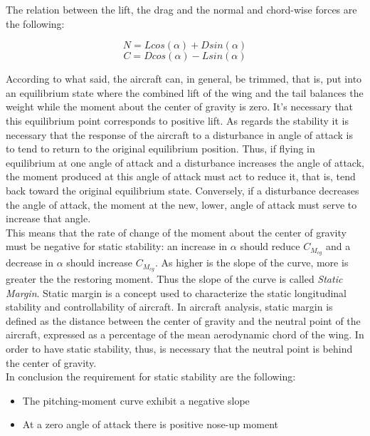 The relation between the lift, the drag and the normal and chord-wise forces are the following:

\begin{equation}
N =L cos({\alpha}) + D sin({\alpha})
\end{equation}
\begin{equation}
C = D cos({\alpha}) - L sin({\alpha})
\end{equation}

According to what said, the aircraft can, in general, be trimmed, that is, put into an equilibrium state where the combined lift of the wing and the tail balances the weight while the moment about the center of gravity is zero. It's necessary that this equilibrium point corresponds to positive lift. As regards the stability it is necessary that the response of the aircraft to a disturbance in angle of attack is to tend to return to the original equilibrium position. Thus, if flying in equilibrium at one angle of attack and a disturbance increases the angle of attack, the moment produced at this angle of attack must act to reduce it, that is, tend back toward the original equilibrium state. Conversely, if a disturbance decreases the angle of attack, the moment at the new, lower, angle of attack must serve to increase that angle. \\
This means that the rate of change of the moment about the center of gravity must be negative for static stability: an increase in $\alpha$ should reduce $C_{M_{cg}}$ and a decrease in $\alpha$ should increase $C_{M_{cg}}$.\cite{sforza2014commercial} As higher is the   slope of the curve, more is greater the the restoring moment. Thus the slope of the curve is called {\itshape Static Margin}.  Static margin is a concept used to characterize the static longitudinal stability and controllability of aircraft.
In aircraft analysis, static margin is defined as the distance between the center of gravity and the neutral point of the aircraft, expressed as a percentage of the mean aerodynamic chord of the wing.  In order to have static stability, thus, is necessary that the neutral point is behind the center of gravity.\\

In conclusion the requirement for static stability are the following:
\begin{itemize}
\item The pitching-moment curve exhibit a negative slope 
\item At a zero angle of attack there is positive nose-up moment
\end{itemize}

